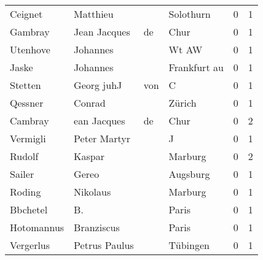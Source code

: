 \begin{tabular}{llllrr}
                  Ceignet &                           Matthieu &             &                                   Solothurn &          0 &         1 \\
                  Gambray &                       Jean Jacques &          de &                                        Chur &          0 &         1 \\
                 Utenhove &                           Johannes &             &                                       Wt AW &          0 &         1 \\
                    Jaske &                           Johannes &             &                                Frankfurt au &          0 &         1 \\
                  Stetten &                        Georg  juhJ &         von &                                           C &          0 &         1 \\
                  Qessner &                             Conrad &             &                                      Zürich &          0 &         1 \\
                  Cambray &                        ean Jacques &          de &                                        Chur &          0 &         2 \\
                 Vermigli &                       Peter Martyr &             &                                           J &          0 &         1 \\
                   Rudolf &                             Kaspar &             &                                     Marburg &          0 &         2 \\
                   Sailer &                              Gereo &             &                                    Augsburg &          0 &         1 \\
                   Roding &                           Nikolaus &             &                                     Marburg &          0 &         1 \\
                 Bbchetel &                                 B. &             &                                       Paris &          0 &         1 \\
               Hotomannus &                         Branziscus &             &                                       Paris &          0 &         1 \\
                Vergerlus &                      Petrus Paulus &             &                                    Tübingen &          0 &         1 \\

\end{tabular}
